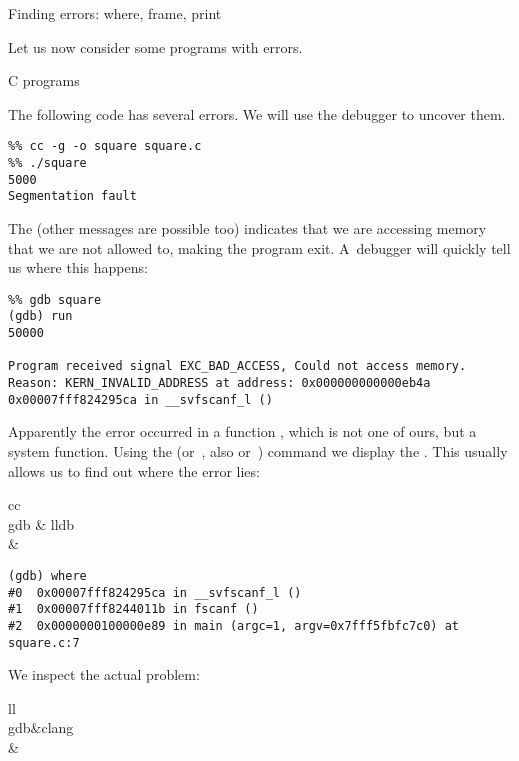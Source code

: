  {Finding errors: where, frame, print}

Let us now consider some programs with errors.

 {C programs}

The following code has several errors.
We will use the debugger to uncover them.

\begin{verbatim}
%% cc -g -o square square.c
%% ./square
5000
Segmentation fault
\end{verbatim}
The  (other messages are possible too) 
indicates that we are accessing
memory that we are not allowed to, making the program exit.
A~debugger will quickly tell us where this happens:
\begin{verbatim}
%% gdb square
(gdb) run
50000

Program received signal EXC_BAD_ACCESS, Could not access memory.
Reason: KERN_INVALID_ADDRESS at address: 0x000000000000eb4a
0x00007fff824295ca in __svfscanf_l ()
\end{verbatim}

Apparently the error occurred in a function , which is
not one of ours, but a system function. Using the 
(or~, also  or~) command we
display the . This usually allows us to find out
where the error lies:

\begin{fntable}{cc}
   \\
  \midrule
  gdb & lldb\\
  \midrule
  &\\
\end{fntable}

{\small
\begin{verbatim}
(gdb) where
#0  0x00007fff824295ca in __svfscanf_l ()
#1  0x00007fff8244011b in fscanf ()
#2  0x0000000100000e89 in main (argc=1, argv=0x7fff5fbfc7c0) at square.c:7
\end{verbatim}
}

We inspect the actual problem:

  \begin{fntable}{ll}
    \\
    \midrule
    gdb&clang\\
    &\\
  \end{fntable}

